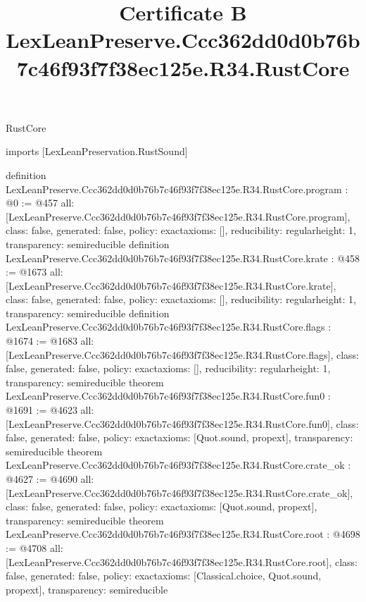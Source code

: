 \begin{lexlean}{RustCore}
\title{Certificate B LexLeanPreserve.Ccc362dd0d0b76b7c46f93f7f38ec125e.R34.RustCore}
\begin{coremodule}
imports [LexLeanPreservation.RustSound]

definition LexLeanPreserve.Ccc362dd0d0b76b7c46f93f7f38ec125e.R34.RustCore.program : @0 := @457 {
  all: [LexLeanPreserve.Ccc362dd0d0b76b7c46f93f7f38ec125e.R34.RustCore.program],
  class: false,
  generated: false,
  policy: exact{axioms: []},
  reducibility: regular{height: 1},
  transparency: semireducible
}
definition LexLeanPreserve.Ccc362dd0d0b76b7c46f93f7f38ec125e.R34.RustCore.krate : @458 := @1673 {
  all: [LexLeanPreserve.Ccc362dd0d0b76b7c46f93f7f38ec125e.R34.RustCore.krate],
  class: false,
  generated: false,
  policy: exact{axioms: []},
  reducibility: regular{height: 1},
  transparency: semireducible
}
definition LexLeanPreserve.Ccc362dd0d0b76b7c46f93f7f38ec125e.R34.RustCore.flags : @1674 := @1683 {
  all: [LexLeanPreserve.Ccc362dd0d0b76b7c46f93f7f38ec125e.R34.RustCore.flags],
  class: false,
  generated: false,
  policy: exact{axioms: []},
  reducibility: regular{height: 1},
  transparency: semireducible
}
theorem LexLeanPreserve.Ccc362dd0d0b76b7c46f93f7f38ec125e.R34.RustCore.fun0 : @1691 := @4623 {
  all: [LexLeanPreserve.Ccc362dd0d0b76b7c46f93f7f38ec125e.R34.RustCore.fun0],
  class: false,
  generated: false,
  policy: exact{axioms: [Quot.sound, propext]},
  transparency: semireducible
}
theorem LexLeanPreserve.Ccc362dd0d0b76b7c46f93f7f38ec125e.R34.RustCore.crate_ok : @4627 := @4690 {
  all: [LexLeanPreserve.Ccc362dd0d0b76b7c46f93f7f38ec125e.R34.RustCore.crate_ok],
  class: false,
  generated: false,
  policy: exact{axioms: [Quot.sound, propext]},
  transparency: semireducible
}
theorem LexLeanPreserve.Ccc362dd0d0b76b7c46f93f7f38ec125e.R34.RustCore.root : @4698 := @4708 {
  all: [LexLeanPreserve.Ccc362dd0d0b76b7c46f93f7f38ec125e.R34.RustCore.root],
  class: false,
  generated: false,
  policy: exact{axioms: [Classical.choice, Quot.sound, propext]},
  transparency: semireducible
}


\end{coremodule}
\end{lexlean}
